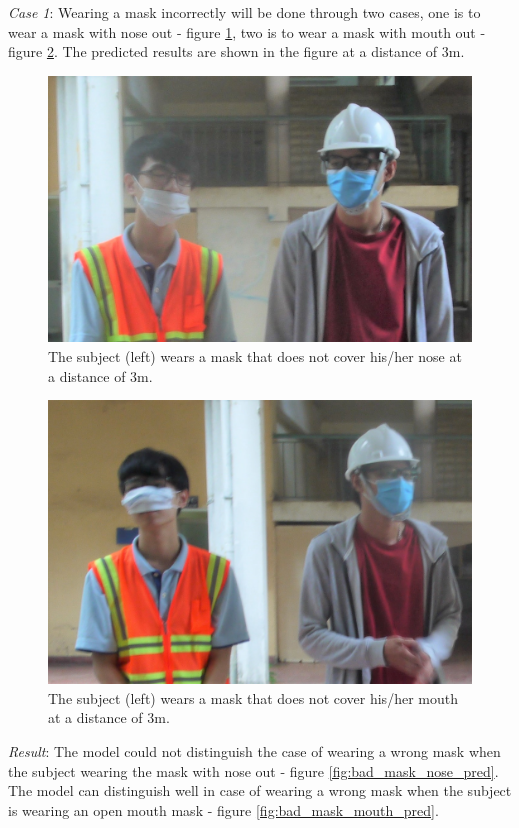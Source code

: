 \documentclass[conference]{IEEEtran}
\begin{document}
\emph{Case 1}: Wearing a mask incorrectly will be done through two cases, one is to wear a mask with nose out - figure \ref{fig:bad_mask_nose}, two is to wear a mask with mouth out - figure \ref{fig:bad_mask_mouth}. The predicted results are shown in the figure at a distance of $ 3 $m.
\begin{figure}[ht]
	\centerline{\includegraphics[scale=0.3]{images/bad_mask_nose.jpg}}
  	\caption{The subject (left) wears a mask that does not cover his/her nose at a distance of 3m.}
  	\label{fig:bad_mask_nose}
\end{figure}
\begin{figure}[ht]
	\centerline{\includegraphics[scale=0.3]{images/bad_mask_mouth.jpg}}
  	\caption{The subject (left) wears a mask that does not cover his/her mouth at a distance of 3m.}
  	\label{fig:bad_mask_mouth}
\end{figure}
\emph{Result}: The model could not distinguish the case of wearing a wrong mask when the subject wearing the mask with nose out - figure \ref{fig:bad_mask_nose_pred}. The model can distinguish well in case of wearing a wrong mask when the subject is wearing an open mouth mask - figure \ref{fig:bad_mask_mouth_pred}.
\end{document}
